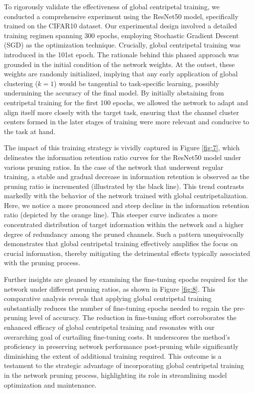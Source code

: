 \documentclass[sigconf, 10pt]{acmart}
\begin{document}
To rigorously validate the effectiveness of global centripetal training, we conducted a comprehensive experiment using the ResNet50 model, specifically trained on the CIFAR10 dataset. Our experimental design involved a detailed training regimen spanning 300 epochs, employing Stochastic Gradient Descent (SGD) as the optimization technique. Crucially, global centripetal training was introduced in the 101st epoch. The rationale behind this phased approach was grounded in the initial condition of the network weights. At the outset, these weights are randomly initialized, implying that any early application of global clustering (\(k=1\)) would be tangential to task-specific learning, possibly undermining the accuracy of the final model. By initially abstaining from centripetal training for the first 100 epochs, we allowed the network to adapt and align itself more closely with the target task, ensuring that the channel cluster centers formed in the later stages of training were more relevant and conducive to the task at hand.

The impact of this training strategy is vividly captured in Figure \ref{fig:7}, which delineates the information retention ratio curves for the ResNet50 model under various pruning ratios. In the case of the network that underwent regular training, a stable and gradual decrease in information retention is observed as the pruning ratio is incremented (illustrated by the black line). This trend contrasts markedly with the behavior of the network trained with global centripetalization. Here, we notice a more pronounced and steep decline in the information retention ratio (depicted by the orange line). This steeper curve indicates a more concentrated distribution of target information within the network and a higher degree of redundancy among the pruned channels. Such a pattern unequivocally demonstrates that global centripetal training effectively amplifies the focus on crucial information, thereby mitigating the detrimental effects typically associated with the pruning process.

Further insights are gleaned by examining the fine-tuning epochs required for the network under different pruning ratios, as shown in Figure \ref{fig:8}. This comparative analysis reveals that applying global centripetal training substantially reduces the number of fine-tuning epochs needed to regain the pre-pruning level of accuracy. The reduction in fine-tuning effort corroborates the enhanced efficacy of global centripetal training and resonates with our overarching goal of curtailing fine-tuning costs. It underscores the method's proficiency in preserving network performance post-pruning while significantly diminishing the extent of additional training required. This outcome is a testament to the strategic advantage of incorporating global centripetal training in the network pruning process, highlighting its role in streamlining model optimization and maintenance.
\end{document}
